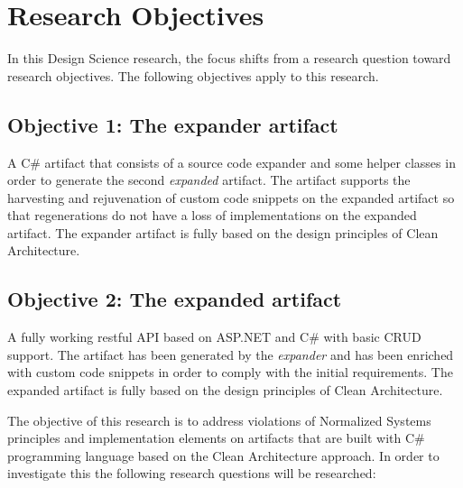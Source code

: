 \section{Research Objectives} \label{sec:research_objectives}

In this Design Science research, the focus shifts from a research question toward
research objectives. The following objectives apply to this research.

\subsection*{Objective 1: The expander artifact}
A C\# artifact that consists of a source code expander and some helper classes in order to
generate the second \emph{expanded} artifact. The artifact supports the harvesting and
rejuvenation of custom code snippets on the expanded artifact so that regenerations do not
have a loss of implementations on the expanded artifact. The expander artifact is fully
based on the design principles of Clean Architecture.

\subsection*{Objective 2: The expanded artifact}
A fully working restful API based on ASP.NET and C\# with basic CRUD support. The artifact
has been generated by the \emph{expander} and has been enriched with custom code snippets
in order to comply with the initial requirements. The expanded artifact is fully based on
the design principles of Clean Architecture.

The objective of this research is to address violations of Normalized Systems principles
and implementation elements on artifacts that are built with C\# programming language
based on the Clean Architecture approach. In order to investigate this the following
research questions will be researched: